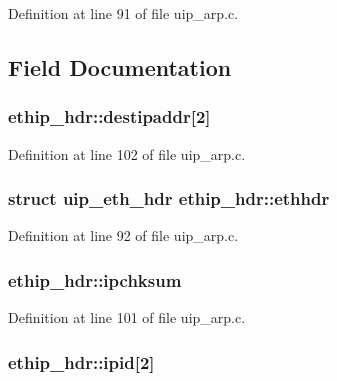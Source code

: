 Definition at line 91 of file uip\_\-arp.c.



\subsection{Field Documentation}
\hypertarget{structethip__hdr_ac25d5ca919211b67436eed0065938015}{
\subsubsection[{destipaddr}]{ {\bf ethip\_\-hdr::destipaddr}\mbox{[}2\mbox{]}}}
\label{structethip__hdr_ac25d5ca919211b67436eed0065938015}


Definition at line 102 of file uip\_\-arp.c.

\hypertarget{structethip__hdr_aaceedb68bd3ad7e63e5829fe0559c79d}{
\subsubsection[{ethhdr}]{\setlength{\rightskip}{0pt plus 5cm}struct {\bf uip\_\-eth\_\-hdr} {\bf ethip\_\-hdr::ethhdr}}}
\label{structethip__hdr_aaceedb68bd3ad7e63e5829fe0559c79d}


Definition at line 92 of file uip\_\-arp.c.

\hypertarget{structethip__hdr_a9f042cc7112fc0e2c05216b14c53a2b1}{
\subsubsection[{ipchksum}]{ {\bf ethip\_\-hdr::ipchksum}}}
\label{structethip__hdr_a9f042cc7112fc0e2c05216b14c53a2b1}


Definition at line 101 of file uip\_\-arp.c.

\hypertarget{structethip__hdr_a694c2d47b9b06967c51d730fc880701d}{
\subsubsection[{ipid}]{ {\bf ethip\_\-hdr::ipid}\mbox{[}2\mbox{]}}}
\label{structethip__hdr_a694c2d47b9b06967c51d730fc880701d}


